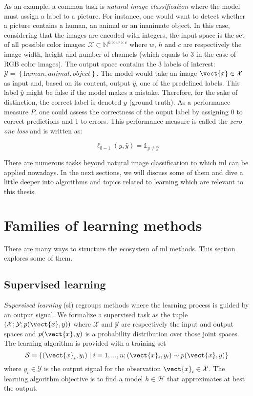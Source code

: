 As an example, a common task is \textit{natural image classification} where the model must assign a label to a picture. For instance, one would want to detect whether a picture contains a human, an animal or an inanimate object. In this case, considering that the images are encoded with integers, the input space is the set of all possible color images: $\mathcal{X} \subset \mathbb{N}^{h\times w\times c}$ where $w$, $h$ and $c$ are respectively the image width, height and number of channels (which equals to 3 in the case of RGB color images). The output space contains the 3 labels of interest: $\mathcal{Y} = \left\{\textit{human}, \textit{animal}, \textit{object}\right\}$. The model would take an image $\vect{x} \in \mathcal{X}$ as input and, based on its content, output $\hat{y}$, one of the predefined labels. This label $\hat{y}$ might be false if the model makes a mistake. Therefore, for the sake of distinction, the correct label is denoted $y$ (\aka ground truth). As a performance measure $P$, one could assess the correctness of the ouput label by assigning 0 to correct predictions and 1 to errors. This performance measure is called the \textit{zero-one loss} and is written as:

\begin{equation}
\ell_{0-1}(y, \hat{y}) = \mathbb{1}_{y\neq\hat{y}}
\end{equation}

There are numerous tasks beyond natural image classification to which \acrlong{ml} can be applied nowadays. In the next sections, we will discuss some of them and dive a little deeper into algorithms and topics related to learning which are relevant to this thesis.

\section{Families of learning methods}
\label{sec:backml:families}

There are many ways to structure the ecosystem of \acrlong{ml} methods. This section explores some of them.

\subsection{Supervised learning}
\label{ssec:backml:sl}

\textit{Supervised learning} (\acrshort{sl}) regroups methods where the learning process is guided by an output signal. We formalize a supervised task as the tuple $\left(\mathcal{X}; \mathcal{Y}; p(\vect{x}, y)\right)$ where $\mathcal{X}$ and $\mathcal{Y}$ are respectively the input and output spaces and $p(\vect{x}, y)$ is a probability distribution over those joint spaces. The learning algorithm is provided with a training set 
\begin{equation}
\label{eqn:backml:supervised}
\mathcal{S} = \left\{(\vect{x}_i, y_i) \mid i = 1,...,n ; (\vect{x}_i, y_i) \sim p(\vect{x}, y) \right\}
\end{equation}
where $y_i \in \mathcal{Y}$ is the output signal for the observation $\vect{x}_i \in \mathcal{X}$. The learning algorithm objective is to find a model $h \in \mathcal{H}$ that approximates at best the output. 

